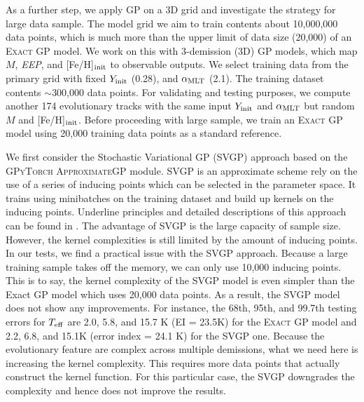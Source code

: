 As a further step, we apply GP on a 3D grid and investigate the strategy for large data sample.
The model grid we aim to train contents about 10,000,000 data points, which is much more than the upper limit of data size (20,000) of an \textsc{Exact GP} model. We work on this with 3-demission (3D) GP models, which map $M$, {\it EEP}, and  [Fe/H]$_{\rm init}$ to observable outputs. 
We select training data from the primary grid with fixed $Y_{\rm init}$ (0.28), and $\alpha_{\rm MLT}$ (2.1). The training dataset contents $\sim$300,000 data points. For validating and testing purposes, we compute another 174 evolutionary tracks with the same input $Y_{\rm init}$ and $\alpha_{\rm MLT}$ but random $M$ and [Fe/H]$_{\rm init}$. Before proceeding with large sample, we train an \textsc{Exact GP} model using 20,000 training data points as a standard reference. 

We first consider the Stochastic Variational GP (SVGP) approach based on the \textsc{GPyTorch ApproximateGP} module. 
SVGP is an approximate scheme rely on the use of a series of inducing points which can be selected in the parameter space. It trains using minibatches on the training dataset and build up kernels on the inducing points. Underline principles and detailed descriptions of this approach can be found in \citet{hensman2015scalable}. The advantage of SVGP is the large capacity of sample size. However, the kernel complexities is still limited by the amount of inducing points. 
%
In our tests, we find a practical issue with the SVGP approach. Because a large training sample takes off the memory, we can only use 10,000 inducing points. This is to say, the kernel complexity of the SVGP model is even simpler than the Exact GP model which uses 20,000 data points. As a result, the SVGP model does not show any improvements. For instance, the 68th, 95th, and 99.7th testing errors for $T_{\rm eff}$ are 2.0, 5.8, and 15.7 K (EI = 23.5K) for the \textsc{Exact GP} model and 2.2, 6.8, and 15.1K (error index = 24.1 K) for the SVGP one. Because the evolutionary feature are complex across multiple demissions, what we need here is increasing the kernel complexity. This requires more data points that actually construct the kernel function. For this particular case, the SVGP downgrades the complexity and hence does not improve the results.   

